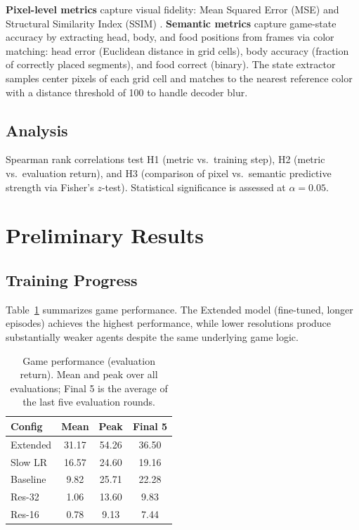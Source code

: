 \documentclass[letterpaper]{article}
\begin{document}
\textbf{Pixel-level metrics} capture visual fidelity: Mean Squared Error (MSE) and Structural Similarity Index (SSIM) \citep{wang2004ssim}. \textbf{Semantic metrics} capture game-state accuracy by extracting head, body, and food positions from frames via color matching: head error (Euclidean distance in grid cells), body accuracy (fraction of correctly placed segments), and food correct (binary). The state extractor samples center pixels of each grid cell and matches to the nearest reference color with a distance threshold of 100 to handle decoder blur.

\subsection{Analysis}

Spearman rank correlations test H1 (metric vs.\ training step), H2 (metric vs.\ evaluation return), and H3 (comparison of pixel vs.\ semantic predictive strength via Fisher's $z$-test). Statistical significance is assessed at $\alpha = 0.05$.


\section{Preliminary Results}

\subsection{Training Progress}

Table~\ref{tab:performance} summarizes game performance. The Extended model (fine-tuned, longer episodes) achieves the highest performance, while lower resolutions produce substantially weaker agents despite the same underlying game logic.

\begin{table}[h]
\centering
\small
\begin{tabular}{lccc}
\toprule
\textbf{Config} & \textbf{Mean} & \textbf{Peak} & \textbf{Final 5} \\
\midrule
Extended    & 31.17 & 54.26 & 36.50 \\
Slow LR     & 16.57 & 24.60 & 19.16 \\
Baseline    &  9.82 & 25.71 & 22.28 \\
Res-32      &  1.06 & 13.60 &  9.83 \\
Res-16      &  0.78 &  9.13 &  7.44 \\
\bottomrule
\end{tabular}
\caption{Game performance (evaluation return). Mean and peak over all evaluations; Final 5 is the average of the last five evaluation rounds.}
\label{tab:performance}
\end{table}
\end{document}

